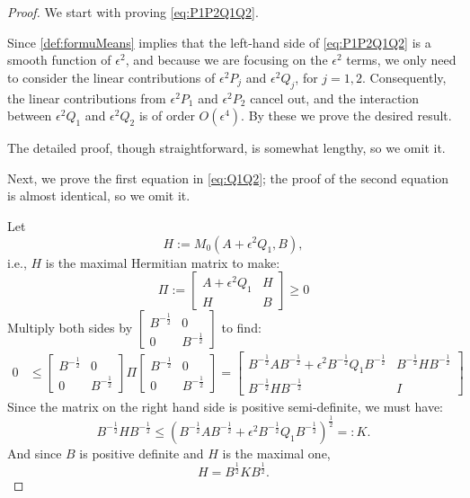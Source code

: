 \documentclass{article}
\numberwithin{equation}{section}
\begin{document}
\begin{proof}
We start with proving \eqref{eq:P1P2Q1Q2}.

Since \eqref{def:formuMeans} implies that the left-hand side of \eqref{eq:P1P2Q1Q2} is a smooth function of $\epsilon^2$, and because we are focusing on the $\epsilon^2$ terms, we only need to consider the linear contributions of $\epsilon^2 P_j$ and $\epsilon^2 Q_j$, for $j = 1, 2$. Consequently, the linear contributions from $\epsilon^2 P_1$ and $\epsilon^2 P_2$ cancel out, and the interaction between $\epsilon^2 Q_1$ and $\epsilon^2 Q_2$ is of order $O(\epsilon^4)$. By these we prove the desired result. 

The detailed proof, though straightforward, is somewhat lengthy, so we omit it.
    
Next, we prove the first equation in \eqref{eq:Q1Q2}; the proof of the second equation is almost identical, so we omit it.

Let $$H := M_0(A + \epsilon^2 Q_1, B),$$ i.e., $H$ is the maximal Hermitian matrix to make:
\[
\Pi := \begin{bmatrix} A + \epsilon^2 Q_1 & H \\ H & B \end{bmatrix} \geq 0
\]
Multiply both sides by $\begin{bmatrix} B^{-\frac{1}{2}} & 0 \\ 0 & B^{-\frac{1}{2}} \end{bmatrix}$ to find:
\begin{align*}
    0 &\leq \begin{bmatrix} B^{-\frac{1}{2}} & 0 \\ 0 & B^{-\frac{1}{2}} \end{bmatrix} \Pi \begin{bmatrix} B^{-\frac{1}{2}} & 0 \\ 0 & B^{-\frac{1}{2}} \end{bmatrix} = \begin{bmatrix} B^{-\frac{1}{2}} A B^{-\frac{1}{2}} + \epsilon^2 B^{-\frac{1}{2}} Q_1 B^{-\frac{1}{2}} & B^{-\frac{1}{2}} H B^{-\frac{1}{2}} \\ B^{-\frac{1}{2}} H B^{-\frac{1}{2}} & I \end{bmatrix}
\end{align*}
Since the matrix on the right hand side is positive semi-definite, we must have:
\begin{equation}\label{def:K}
B^{-\frac{1}{2}} H B^{-\frac{1}{2}} \leq (B^{-\frac{1}{2}} A B^{-\frac{1}{2}} + \epsilon^2 B^{-\frac{1}{2}} Q_1 B^{-\frac{1}{2}})^{\frac{1}{2}}=:K.
\end{equation}
And since $B$ is positive definite and $H$ is the maximal one,
\begin{equation}\label{eq:expandH}
H = B^{\frac{1}{2}} K B^{\frac{1}{2}} .
\end{equation}



\end{proof}
\end{document}
